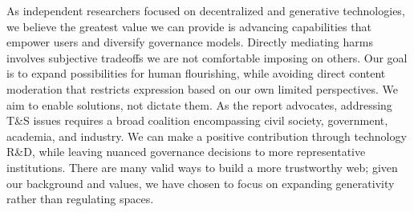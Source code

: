 As independent researchers focused on decentralized and generative technologies, we believe the greatest value we can provide is advancing capabilities that empower users and diversify governance models. Directly mediating harms involves subjective tradeoffs we are not comfortable imposing on others. Our goal is to expand possibilities for human flourishing, while avoiding direct content moderation that restricts expression based on our own limited perspectives. We aim to enable solutions, not dictate them. As the report advocates, addressing T\&S issues requires a broad coalition encompassing civil society, government, academia, and industry. We can make a positive contribution through technology R\&D, while leaving nuanced governance decisions to more representative institutions. There are many valid ways to build a more trustworthy web; given our background and values, we have chosen to focus on expanding generativity rather than regulating spaces.
